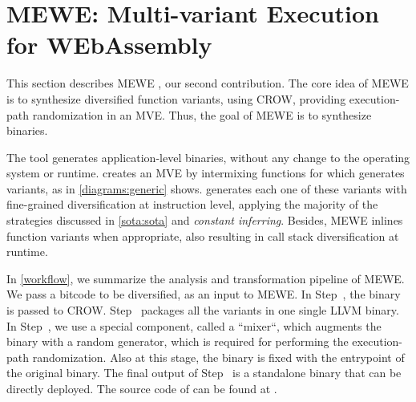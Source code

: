 \section{MEWE: Multi-variant Execution for WEbAssembly}
\label{section:mewe}

\newcommand{\tool}{MEWE\xspace}
\newcommand{\repourl}{TODO}
This section describes MEWE \cite{MEWE}, our second contribution. 
The core idea of \tool is to synthesize diversified function variants, using CROW, providing execution-path randomization in an MVE. Thus, the goal of \tool is to synthesize  \wasm binaries. %

The tool generates application-level binaries, without any change to the operating system or \wasm runtime.
creates an MVE by intermixing functions for which generates variants, as  in \autoref{diagrams:generic} shows.
generates each one of these variants with fine-grained diversification at instruction level, applying the majority of the strategies discussed in \autoref{sota:sota} and \emph{constant inferring}. Besides, \tool inlines function variants when appropriate, also resulting in call stack diversification at runtime.

In \autoref{workflow}, we summarize the analysis and transformation pipeline of \tool.
We pass a bitcode to be diversified, as an input to \tool.
In Step~, the binary is passed to CROW. 
Step~ packages all the variants in one single LLVM binary. 
In Step~, we use a special component, called a ``mixer``,  which augments the binary with a random generator, which is required for performing the execution-path randomization. 
Also at this stage, the binary is fixed with the entrypoint of the original binary.
The final output of Step~ is a standalone \wasm binary that can be directly deployed. 
The source code of can be found at \todo{}.

